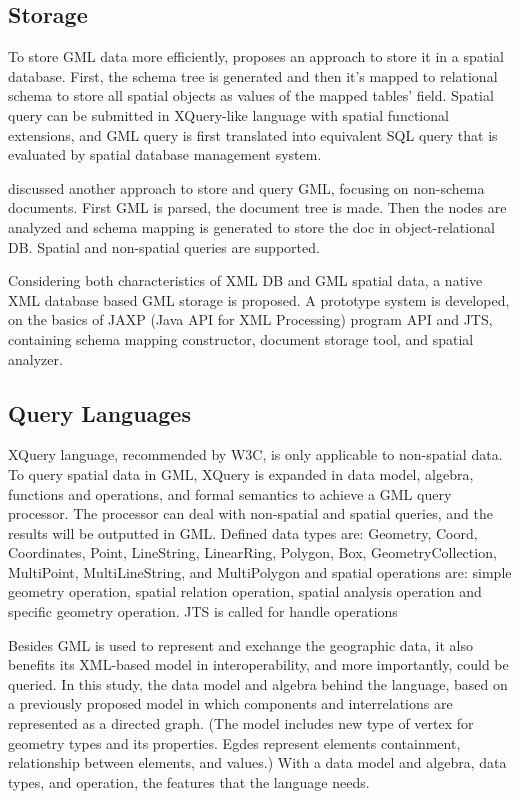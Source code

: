 \documentclass[a4paper,12pt]{article}
\begin{document}
\subsection{Storage}
\label{storage}
To store GML data more efficiently, \cite{Li2004} proposes an approach 
to store it in a spatial database. First, the schema tree is generated
 and then it's mapped to relational schema to store all spatial objects as 
values of the mapped tables' field.  Spatial query can be submitted 
in XQuery\cite{xquery}-like language with spatial functional extensions, and GML 
query is first translated into equivalent SQL query that is evaluated 
by spatial database management system.

\cite{Zhu2011} discussed another approach to store and query GML, 
focusing on non-schema documents.
First GML is parsed, the document tree is made. Then the nodes are analyzed and 
schema mapping is generated to store the doc in object-relational DB. 
Spatial and non-spatial queries are supported.

\cite{Zhang2008} Considering both characteristics of XML DB and GML spatial data, 
a native XML database based GML storage is proposed. A prototype system 
is developed, on the basics of JAXP (Java API for XML Processing) program API 
and JTS, containing schema mapping constructor, document storage tool, 
and spatial analyzer.

\subsection{Query Languages}
\label{index}
\cite{Fubao2010} XQuery language, recommended by W3C, is only 
applicable to non-spatial data. To query spatial data in GML, 
XQuery is expanded in data model, algebra, functions and operations, 
and formal semantics to achieve a GML query processor. The processor can 
deal with non-spatial and spatial queries, and the results will be outputted in GML.
Defined data types are: Geometry, Coord, Coordinates, Point, LineString, LinearRing, 
Polygon, Box, GeometryCollection, MultiPoint, MultiLineString, and MultiPolygon 
and spatial operations are: simple geometry operation, spatial relation 
operation, spatial analysis operation and specific geometry operation. 
JTS is called for handle operations

\cite{corcoles2001} Besides GML is used to represent and exchange 
the geographic data, it also benefits its XML-based model in interoperability, 
and more importantly, could be queried. In this study, the data model 
and algebra behind the language, based on a previously proposed model 
in which components and interrelations are represented as a directed graph. 
(The model includes new type of vertex for geometry types and its properties. 
Egdes represent elements containment, relationship between elements, and values.) 
With a data model and algebra, data types, and operation, the features that the language needs.
\end{document}
